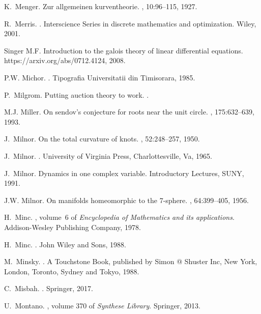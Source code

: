 \documentclass[12pt]{amsart}
\begin{document}
\begin{thebibliography}{100}
K.~Menger.
\newblock Zur allgemeinen kurventheorie.
, 10:96--115, 1927.

R.~Merris.
.
\newblock Interscience Series in discrete mathematics and optimization. Wiley,
  2001.

Singer M.F.
\newblock Introduction to the galois theory of linear differential equations.
\newblock https://arxiv.org/abs/0712.4124, 2008.

P.W. Michor.
.
\newblock Tipografia Universitatii din Timisorara, 1985.

P.~Milgrom.
\newblock Putting auction theory to work.
.

M.J. Miller.
\newblock On sendov's conjecture for roots near the unit circle.
, 175:632--639, 1993.

J.~Milnor.
\newblock On the total curvature of knots.
, 52:248--257, 1950.

J.~Milnor.
.
\newblock University of Virginia Press, Charlottesville, Va, 1965.

J.~Milnor.
\newblock Dynamics in one complex variable.
\newblock Introductory Lectures, SUNY, 1991.

J.W. Milnor.
\newblock On manifolds homeomorphic to the 7-sphere.
, 64:399--405, 1956.

H.~Minc.
, volume~6 of {\em Encyclopedia of Mathematics and
  its applications}.
\newblock Addison-Wesley Publishing Company, 1978.

H.~Minc.
.
\newblock John Wiley and Sons, 1988.

M.~Minsky.
.
\newblock A Touchstone Book, published by Simon @ Shuster Inc, New York,
  London, Toronto, Sydney and Tokyo, 1988.

C.~Misbah.
.
\newblock Springer, 2017.

U.~Montano.
, volume 370 of {\em Synthese Library}.
\newblock Springer, 2013.


\end{thebibliography}
\end{document}
